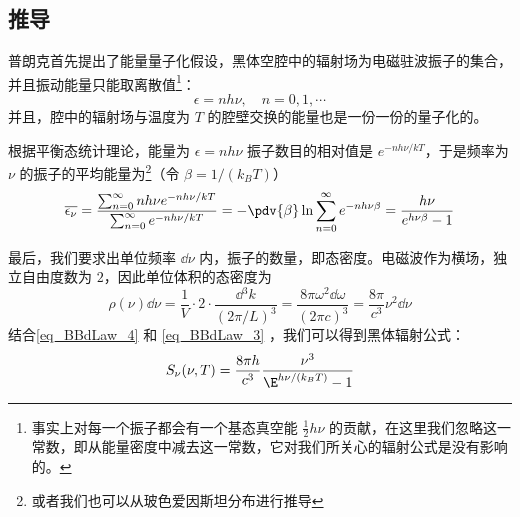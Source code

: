 \subsection{推导}
普朗克首先提出了能量量子化假设，黑体空腔中的辐射场为电磁驻波振子的集合，并且振动能量只能取离散值\footnote{事实上对每一个振子都会有一个基态真空能 $\frac{1}{2}h\nu$ 的贡献，在这里我们忽略这一常数，即从能量密度中减去这一常数，它对我们所关心的辐射公式是没有影响的。}：
\begin{equation}
\epsilon = nh\nu, \quad n=0,1,\cdots
\end{equation}
并且，腔中的辐射场与温度为 $T$ 的腔壁交换的能量也是一份一份的量子化的。

根据平衡态统计理论，能量为 $\epsilon=nh\nu$ 振子数目的相对值是 $e^{-nh\nu/kT}$，于是频率为 $\nu$ 的振子的平均能量为\footnote{或者我们也可以从玻色爱因斯坦分布进行推导}（令 $\beta = 1/(k_BT)$）
\begin{equation}\label{eq_BBdLaw_4}
\overline{\epsilon_\nu}=\frac{\sum_{n=0}^\infty nh\nu e^{-nh\nu/kT}}{\sum_{n=0}^\infty e^{-nh\nu/kT}}=-\pdv{\beta}\ln \sum_{n=0}^\infty e^{-nh\nu\beta}=\frac{h\nu}{e^{h\nu\beta}-1}
\end{equation}

最后，我们要求出单位频率 $\dd \nu$ 内，振子的数量，即态密度。电磁波作为横场，独立自由度数为 $2$，因此单位体积的态密度为
\begin{equation}\label{eq_BBdLaw_3}
\rho(\nu) \dd \nu= \frac{1}{V}\cdot 2\cdot \frac{\dd{} ^3 k}{(2\pi/L)^3}=\frac{8\pi \omega^2 \dd \omega}{(2\pi c)^3}= \frac{8\pi}{c^3}\nu^2\dd \nu
\end{equation}
结合\autoref{eq_BBdLaw_4} 和 \autoref{eq_BBdLaw_3} ，我们可以得到黑体辐射公式：
\begin{equation}
S_\nu(\nu,T) = \frac{8\pi h}{c^3}\frac{\nu^3}{\E^{h\nu/(k_B T)} - 1}
\end{equation}
